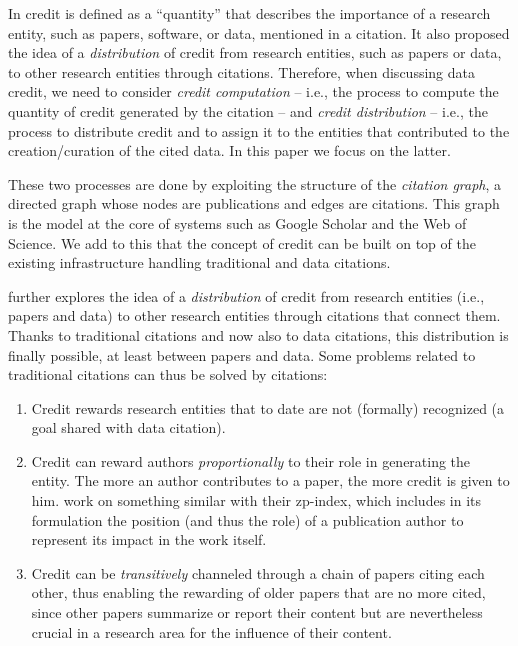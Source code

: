 \documentclass[preprint,12pt,sort&compress]{elsarticle}
\newcommand{\rone}[1]{\textcolor{reviewer1}{#1}}
\begin{document}
In \citep{transitiveCreditKatz2014} credit is defined as a ``quantity'' that describes the importance of a research entity, such as papers, software, or data, mentioned in a citation. 
It also proposed the idea of a \emph{distribution} of credit from research entities, such as papers or data, to other research entities through citations. 
\rone{Therefore, when discussing data credit, we need to consider  \emph{credit computation} -- i.e., the process to compute the quantity of credit generated by the citation -- and \emph{credit distribution} -- i.e., the process to distribute credit and to assign it to the entities that contributed to the creation/curation of the cited data. In this paper we focus on the latter.}

\rone{These two processes are} done by exploiting the structure of the \emph{citation graph}, a directed graph whose nodes are publications and edges are citations.
This graph is the model at the core of systems such as Google Scholar and the Web of Science.
We add to this that the concept of credit can be built on top of the existing infrastructure handling traditional and data citations.

\citet{transitiveCreditKatz2014} further explores the idea of a \emph{distribution} of credit from research entities (i.e., papers and data) to other research entities through citations that connect them. 
Thanks to traditional citations and now also to data citations, this distribution is finally possible, at least between papers and data. 
Some problems related to traditional citations can thus be solved by citations:

\begin{enumerate}
\item Credit rewards research entities that to date are not (formally) recognized (a goal shared with data citation).
\item Credit can reward authors \emph{proportionally} to their role in generating the entity. The more an author contributes to a paper, the more credit is given to him. \citet{ZouP16} work on something similar with their zp-index, which includes in its formulation the position (and thus the role) of a publication author to represent its impact in the work itself.
\item Credit can be \emph{transitively} channeled through a chain of papers citing each other, thus enabling the rewarding of older papers that are no more cited, since other papers summarize or report their content 
but are nevertheless crucial in a research area for the influence of their content.
\end{enumerate}
\end{document}
